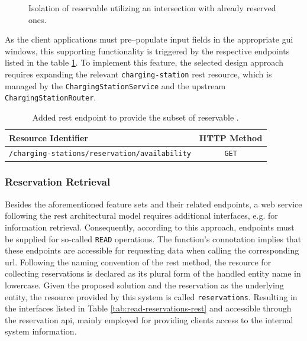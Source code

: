 \begin{figure}[h]
    \centering
    \caption{Isolation of reservable  utilizing an intersection with already reserved ones.}
    \label{fig:reservable-cs}
\end{figure}

\noindent As the client applications must pre--populate input fields in the appropriate \acrshort{gui} windows, this supporting functionality is triggered by the respective endpoints listed in the table \ref{tab:reservable-cs-rest}. To implement this feature, the selected design approach requires expanding the relevant \texttt{charging-station} \acrshort{rest} resource, which is managed by the \texttt{ChargingStationService} and the upstream \texttt{ChargingStationRouter}.

\begingroup
\setlength{\tabcolsep}{10pt} %
\renewcommand{\arraystretch}{1.5} %
\begin{table}[h]
\centering
\caption{Added \acrshort{rest} endpoint to provide the subset of reservable .}
    \begin{tabular}{l|c}
    Resource Identifier & HTTP Method \\ \hline
    \texttt{/charging-stations/reservation/availability} & \texttt{GET}
    \end{tabular}
\label{tab:reservable-cs-rest}
\end{table}
\endgroup

\subsubsection{Reservation Retrieval}
\label{ch:Implementation:sec:Reservation System:ssec:Additional Capabilities:sssec:Reservation Retrieval}

Besides the aforementioned feature sets and their related endpoints, a web service following the \acrshort{rest} architectural model requires additional interfaces, e.g. for information retrieval.
Consequently, according to this approach, endpoints must be supplied for so-called \texttt{READ} operations. The function's connotation implies that these endpoints are accessible for requesting data when calling the corresponding \acrshort{url}.
Following the naming convention of the \acrshort{rest} method, the resource for collecting reservations is declared as its plural form of the handled entity name in lowercase. Given the proposed solution and the reservation as the underlying entity, the resource provided by this system is called \texttt{reservations}.
Resulting in the interfaces listed in Table \ref{tab:read-reservations-rest} and accessible through the reservation \acrshort{api}, mainly employed for providing clients access to the internal system information.

